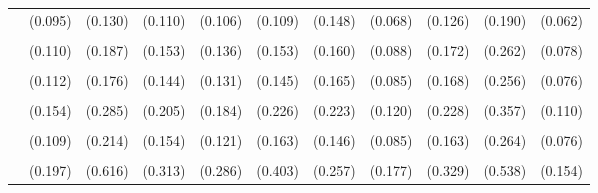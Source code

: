 \documentclass[3p, authoryear]{elsarticle} %
\begin{document}
\begin{landscape}
\begin{table}
{\begin{tabular}[t]{lcccccccccc}
 & (0.095) & (0.130) & (0.110) & (0.106) & (0.109) & (0.148) & (0.068) & (0.126) & (0.190) & (0.062)\\
\cellcolor{gray!6}{Basketball} & \cellcolor{gray!6}{-0.009} & \cellcolor{gray!6}{-0.305} & \cellcolor{gray!6}{-0.458***} & \cellcolor{gray!6}{-0.413***} & \cellcolor{gray!6}{-0.187} & \cellcolor{gray!6}{-0.109} & \cellcolor{gray!6}{-0.300***} & \cellcolor{gray!6}{-0.316*} & \cellcolor{gray!6}{-0.301} & \cellcolor{gray!6}{-0.215***}\\
 & (0.110) & (0.187) & (0.153) & (0.136) & (0.153) & (0.160) & (0.088) & (0.172) & (0.262) & (0.078)\\
\cellcolor{gray!6}{Baseball} & \cellcolor{gray!6}{0.126} & \cellcolor{gray!6}{0.151} & \cellcolor{gray!6}{0.090} & \cellcolor{gray!6}{-0.066} & \cellcolor{gray!6}{0.054} & \cellcolor{gray!6}{-0.108} & \cellcolor{gray!6}{0.139} & \cellcolor{gray!6}{0.127} & \cellcolor{gray!6}{-0.038} & \cellcolor{gray!6}{0.085}\\
 & (0.112) & (0.176) & (0.144) & (0.131) & (0.145) & (0.165) & (0.085) & (0.168) & (0.256) & (0.076)\\
\cellcolor{gray!6}{Football / Soccer} & \cellcolor{gray!6}{-0.495***} & \cellcolor{gray!6}{-1.014***} & \cellcolor{gray!6}{-0.247} & \cellcolor{gray!6}{-0.465**} & \cellcolor{gray!6}{-0.886***} & \cellcolor{gray!6}{-0.263} & \cellcolor{gray!6}{-0.451***} & \cellcolor{gray!6}{-0.163} & \cellcolor{gray!6}{-0.964***} & \cellcolor{gray!6}{-0.538***}\\
 & (0.154) & (0.285) & (0.205) & (0.184) & (0.226) & (0.223) & (0.120) & (0.228) & (0.357) & (0.110)\\
\cellcolor{gray!6}{Tennis} & \cellcolor{gray!6}{0.394***} & \cellcolor{gray!6}{-0.557***} & \cellcolor{gray!6}{0.114} & \cellcolor{gray!6}{0.452***} & \cellcolor{gray!6}{-0.096} & \cellcolor{gray!6}{0.659***} & \cellcolor{gray!6}{0.201**} & \cellcolor{gray!6}{0.348**} & \cellcolor{gray!6}{-0.059} & \cellcolor{gray!6}{0.229***}\\
 & (0.109) & (0.214) & (0.154) & (0.121) & (0.163) & (0.146) & (0.085) & (0.163) & (0.264) & (0.076)\\
\cellcolor{gray!6}{Volleyball} & \cellcolor{gray!6}{0.702***} & \cellcolor{gray!6}{-0.077} & \cellcolor{gray!6}{0.698**} & \cellcolor{gray!6}{0.299} & \cellcolor{gray!6}{0.433} & \cellcolor{gray!6}{0.446*} & \cellcolor{gray!6}{0.593***} & \cellcolor{gray!6}{0.549*} & \cellcolor{gray!6}{0.424} & \cellcolor{gray!6}{0.610***}\\
 & (0.197) & (0.616) & (0.313) & (0.286) & (0.403) & (0.257) & (0.177) & (0.329) & (0.538) & (0.154)\\

\end{tabular}}
\end{table}
\end{landscape}
\end{document}
